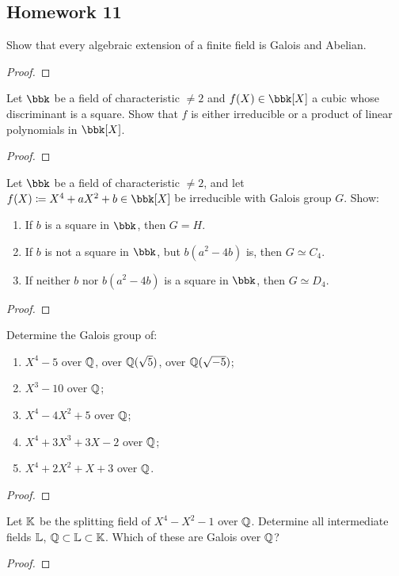 \subsection{Homework 11}
\begin{problem}
  Show that every algebraic extension of a finite field is Galois and
  Abelian.
\end{problem}
\begin{proof}
\end{proof}

\begin{problem}
  Let $\bbk$ be a field of characteristic $\neq 2$ and $f(X)\in\bbk[X]$ a
  cubic whose discriminant is a square. Show that $f$ is either irreducible
  or a product of linear polynomials in $\bbk[X]$.
\end{problem}
\begin{proof}
\end{proof}

\begin{problem}
  Let $\bbk$ be a field of characteristic $\neq 2$, and let
  $f(X)\coloneq X^4+aX^2+b\in\bbk[X]$ be irreducible with Galois group
  $G$. Show:
  \begin{enumerate}[label=(\roman*),noitemsep]
  \item If $b$ is a square in $\bbk$, then $G=H$.
  \item If $b$ is not a square in $\bbk$, but $b(a^2-4b)$ is, then
    $G\simeq C_4$.
  \item If neither $b$ nor $b(a^2-4b)$ is a square in $\bbk$, then
    $G\simeq D_4$.
  \end{enumerate}
\end{problem}
\begin{proof}
\end{proof}

\begin{problem}
  Determine the Galois group of:
  \begin{enumerate}[label=(\alph*),noitemsep]
  \item $X^4-5$ over $\mathbb{Q}$, over $\mathbb{Q}(\sqrt{5})$, over $\mathbb{Q}(\sqrt{-5})$;
  \item $X^3-10$ over $\mathbb{Q}$;
  \item $X^4-4X^2+5$ over $\mathbb{Q}$;
  \item $X^4+3X^3+3X-2$ over $\mathbb{Q}$;
  \item $X^4+2X^2+X+3$ over $\mathbb{Q}$.
  \end{enumerate}
\end{problem}
\begin{proof}
\end{proof}

\begin{problem}
  Let $\mathbb{K}$ be the splitting field of $X^4-X^2-1$ over $\mathbb{Q}$. Determine
  all intermediate fields $\mathbb{L}$, $\mathbb{Q}\subset\mathbb{L}\subset\mathbb{K}$. Which of
  these are Galois over $\mathbb{Q}$?
\end{problem}
\begin{proof}
\end{proof}

